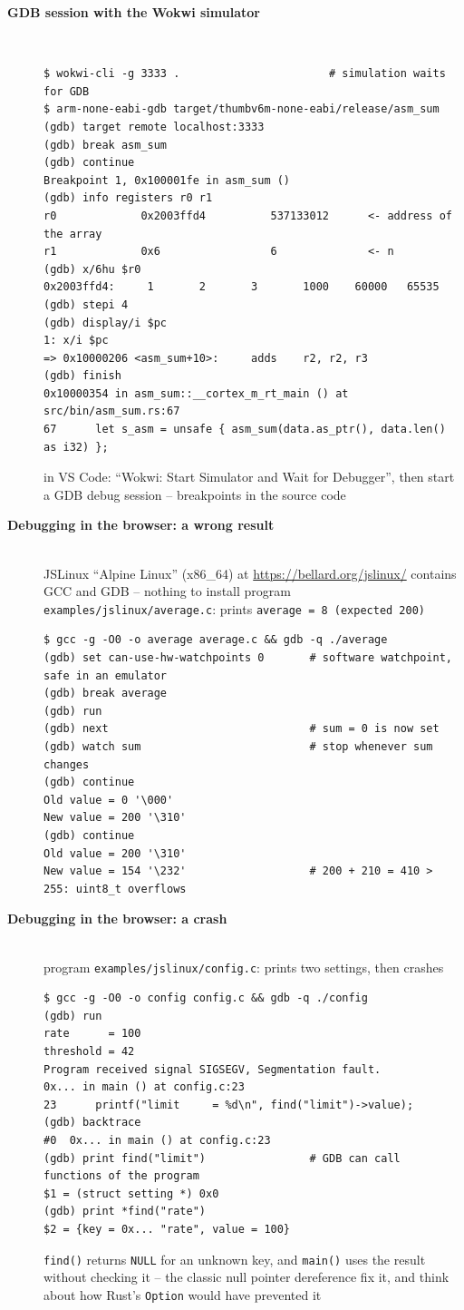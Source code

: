 \begin{description}
\item[{\rot\bf GDB session with the Wokwi simulator}]~\\[-\lstskip]
\begin{lstlisting}[language={}]
$ wokwi-cli -g 3333 .                       # simulation waits for GDB
$ arm-none-eabi-gdb target/thumbv6m-none-eabi/release/asm_sum
(gdb) target remote localhost:3333
(gdb) break asm_sum
(gdb) continue
Breakpoint 1, 0x100001fe in asm_sum ()
(gdb) info registers r0 r1
r0             0x2003ffd4          537133012      <- address of the array
r1             0x6                 6              <- n
(gdb) x/6hu $r0
0x2003ffd4:     1       2       3       1000    60000   65535
(gdb) stepi 4
(gdb) display/i $pc
1: x/i $pc
=> 0x10000206 <asm_sum+10>:     adds    r2, r2, r3
(gdb) finish
0x10000354 in asm_sum::__cortex_m_rt_main () at src/bin/asm_sum.rs:67
67      let s_asm = unsafe { asm_sum(data.as_ptr(), data.len() as i32) };
\end{lstlisting}
\bi
	\ite in VS Code: ``Wokwi: Start Simulator and Wait for Debugger'', then start a GDB debug session -- breakpoints in the source code
\ei
\os{\newpage}

\item[{\rot\bf Debugging in the browser: a wrong result}]~\\
\bi
	\ite JSLinux ``Alpine Linux'' (x86\_64) at \url{https://bellard.org/jslinux/} contains GCC and GDB -- nothing to install
	\ite program \texttt{examples/jslinux/average.c}: prints \texttt{average = 8 (expected 200)}
\ei
\begin{lstlisting}[language={}]
$ gcc -g -O0 -o average average.c && gdb -q ./average
(gdb) set can-use-hw-watchpoints 0       # software watchpoint, safe in an emulator
(gdb) break average
(gdb) run
(gdb) next                               # sum = 0 is now set
(gdb) watch sum                          # stop whenever sum changes
(gdb) continue
Old value = 0 '\000'
New value = 200 '\310'
(gdb) continue
Old value = 200 '\310'
New value = 154 '\232'                   # 200 + 210 = 410 > 255: uint8_t overflows
\end{lstlisting}
\os{\newpage}

\item[{\rot\bf Debugging in the browser: a crash}]~\\
\bi
	\ite program \texttt{examples/jslinux/config.c}: prints two settings, then crashes
\ei
\begin{lstlisting}[language={}]
$ gcc -g -O0 -o config config.c && gdb -q ./config
(gdb) run
rate      = 100
threshold = 42
Program received signal SIGSEGV, Segmentation fault.
0x... in main () at config.c:23
23	    printf("limit     = %d\n", find("limit")->value);
(gdb) backtrace
#0  0x... in main () at config.c:23
(gdb) print find("limit")                # GDB can call functions of the program
$1 = (struct setting *) 0x0
(gdb) print *find("rate")
$2 = {key = 0x... "rate", value = 100}
\end{lstlisting}
\bi
	\ite \texttt{find()} returns \texttt{NULL} for an unknown key, and \texttt{main()} uses the result without checking it -- the classic null pointer dereference
	\ite fix it, and think about how Rust's \texttt{Option} would have prevented it
\ei
\os{\newpage}


\end{description}
